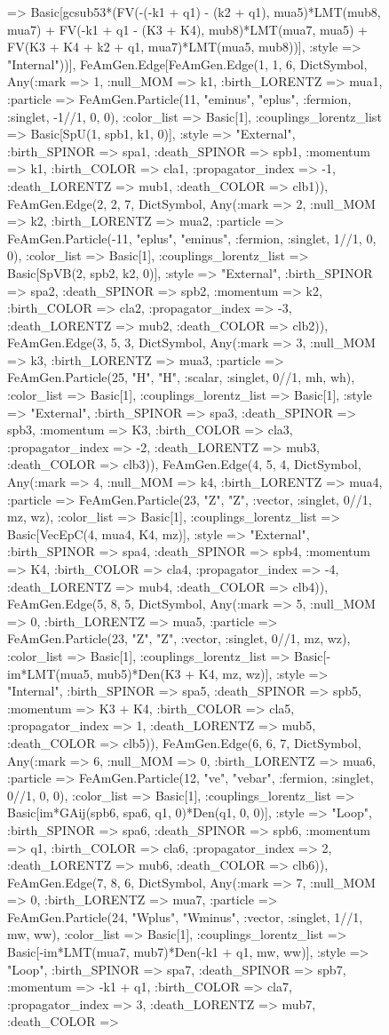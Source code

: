 \documentclass{revtex4}
\begin{document}
\begin{figure}[!htb]
\begin{center}
{=> Basic[gcsub53*(FV(-(-k1 + q1) - (k2 + q1), mua5)*LMT(mub8, mua7) + FV(-k1 + q1 - (K3 + K4), mub8)*LMT(mua7, mua5) + FV(K3 + K4 + k2 + q1, mua7)*LMT(mua5, mub8))], :style => "Internal"))], FeAmGen.Edge[FeAmGen.Edge(1, 1, 6, Dict{Symbol, Any}(:mark => 1, :null_MOM => k1, :birth_LORENTZ => mua1, :particle => FeAmGen.Particle(11, "eminus", "eplus", :fermion, :singlet, -1//1, 0, 0), :color_list => Basic[1], :couplings_lorentz_list => Basic[SpU(1, spb1, k1, 0)], :style => "External", :birth_SPINOR => spa1, :death_SPINOR => spb1, :momentum => k1, :birth_COLOR => cla1, :propagator_index => -1, :death_LORENTZ => mub1, :death_COLOR => clb1)), FeAmGen.Edge(2, 2, 7, Dict{Symbol, Any}(:mark => 2, :null_MOM => k2, :birth_LORENTZ => mua2, :particle => FeAmGen.Particle(-11, "eplus", "eminus", :fermion, :singlet, 1//1, 0, 0), :color_list => Basic[1], :couplings_lorentz_list => Basic[SpVB(2, spb2, k2, 0)], :style => "External", :birth_SPINOR => spa2, :death_SPINOR => spb2, :momentum => k2, :birth_COLOR => cla2, :propagator_index => -3, :death_LORENTZ => mub2, :death_COLOR => clb2)), FeAmGen.Edge(3, 5, 3, Dict{Symbol, Any}(:mark => 3, :null_MOM => k3, :birth_LORENTZ => mua3, :particle => FeAmGen.Particle(25, "H", "H", :scalar, :singlet, 0//1, mh, wh), :color_list => Basic[1], :couplings_lorentz_list => Basic[1], :style => "External", :birth_SPINOR => spa3, :death_SPINOR => spb3, :momentum => K3, :birth_COLOR => cla3, :propagator_index => -2, :death_LORENTZ => mub3, :death_COLOR => clb3)), FeAmGen.Edge(4, 5, 4, Dict{Symbol, Any}(:mark => 4, :null_MOM => k4, :birth_LORENTZ => mua4, :particle => FeAmGen.Particle(23, "Z", "Z", :vector, :singlet, 0//1, mz, wz), :color_list => Basic[1], :couplings_lorentz_list => Basic[VecEpC(4, mua4, K4, mz)], :style => "External", :birth_SPINOR => spa4, :death_SPINOR => spb4, :momentum => K4, :birth_COLOR => cla4, :propagator_index => -4, :death_LORENTZ => mub4, :death_COLOR => clb4)), FeAmGen.Edge(5, 8, 5, Dict{Symbol, Any}(:mark => 5, :null_MOM => 0, :birth_LORENTZ => mua5, :particle => FeAmGen.Particle(23, "Z", "Z", :vector, :singlet, 0//1, mz, wz), :color_list => Basic[1], :couplings_lorentz_list => Basic[-im*LMT(mua5, mub5)*Den(K3 + K4, mz, wz)], :style => "Internal", :birth_SPINOR => spa5, :death_SPINOR => spb5, :momentum => K3 + K4, :birth_COLOR => cla5, :propagator_index => 1, :death_LORENTZ => mub5, :death_COLOR => clb5)), FeAmGen.Edge(6, 6, 7, Dict{Symbol, Any}(:mark => 6, :null_MOM => 0, :birth_LORENTZ => mua6, :particle => FeAmGen.Particle(12, "ve", "vebar", :fermion, :singlet, 0//1, 0, 0), :color_list => Basic[1], :couplings_lorentz_list => Basic[im*GAij(spb6, spa6, q1, 0)*Den(q1, 0, 0)], :style => "Loop", :birth_SPINOR => spa6, :death_SPINOR => spb6, :momentum => q1, :birth_COLOR => cla6, :propagator_index => 2, :death_LORENTZ => mub6, :death_COLOR => clb6)), FeAmGen.Edge(7, 8, 6, Dict{Symbol, Any}(:mark => 7, :null_MOM => 0, :birth_LORENTZ => mua7, :particle => FeAmGen.Particle(24, "Wplus", "Wminus", :vector, :singlet, 1//1, mw, ww), :color_list => Basic[1], :couplings_lorentz_list => Basic[-im*LMT(mua7, mub7)*Den(-k1 + q1, mw, ww)], :style => "Loop", :birth_SPINOR => spa7, :death_SPINOR => spb7, :momentum => -k1 + q1, :birth_COLOR => cla7, :propagator_index => 3, :death_LORENTZ => mub7, :death_COLOR => }
\end{center}
\end{figure}
\end{document}
